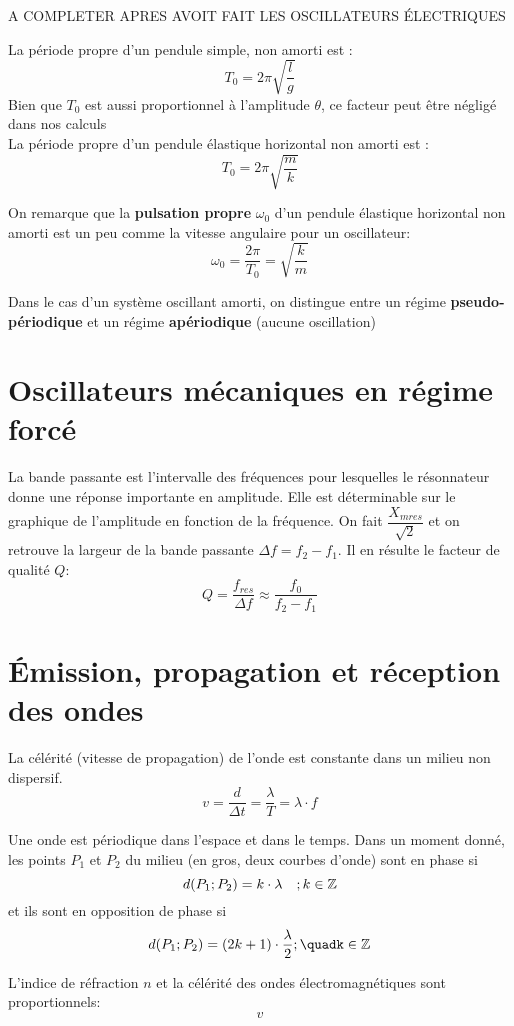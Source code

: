 \begin{Definition}
A COMPLETER APRES AVOIT FAIT LES OSCILLATEURS ÉLECTRIQUES

La période propre d'un pendule simple, non amorti est :
$$T_{0}=2\pi\sqrt{\dfrac{l}{g}}$$
Bien que $T_{0}$ est aussi proportionnel à l'amplitude $\theta$, ce facteur peut être négligé dans nos calculs\\

La période propre d'un pendule élastique horizontal non amorti est :
$$T_{0}=2\pi\sqrt{\dfrac{m}{k}}$$

On remarque que la \textbf{pulsation propre} $\omega_{0}$ d'un pendule élastique horizontal non amorti est un peu comme la vitesse angulaire pour un oscillateur:
$$\omega_{0}=\dfrac{2\pi}{T_{0}}=\sqrt{\dfrac{k}{m}}$$

Dans le cas d'un système oscillant amorti, on distingue entre un régime \textbf{pseudo-périodique} et un régime \textbf{apériodique} (aucune oscillation)

\end{Definition}



\section{Oscillateurs mécaniques en régime forcé}

\begin{Definition}

La bande passante est l'intervalle des fréquences pour lesquelles le résonnateur donne une réponse importante en amplitude. Elle est déterminable sur le graphique de l'amplitude en fonction de la fréquence. On fait $\dfrac{X_{mres}}{\sqrt{2}}$ et on retrouve la largeur de la bande passante $\Delta f = f_{2} - f_{1}$. Il en résulte le facteur de qualité $Q$:
$$Q=\dfrac{f_{res}}{\Delta f} \approx \dfrac{f_{0}}{f_{2}-f_{1}} $$

\end{Definition}



\section{Émission, propagation et réception des ondes}

\begin{Definition}

La célérité (vitesse de propagation) de l'onde est constante dans un milieu non dispersif.
$$v=\dfrac{d}{\Delta t} = \dfrac{\lambda}{T} = \lambda \cdot f$$

Une onde est périodique dans l'espace et dans le temps. Dans un moment donné, les points $P_{1}$ et $P_{2}$ du milieu (en gros, deux courbes d'onde) sont en phase si
$$d(P_{1};P_{2})=k\cdot\lambda\quad;k\in\mathbb{Z}$$
et ils sont en opposition de phase si
$$d(P_{1};P_{2})=(2k+1)\cdot\dfrac{\lambda}{2};\quadk\in\Z$$

L'indice de réfraction $n$ et la célérité des ondes électromagnétiques sont proportionnels:
$$v$$
\end{Definition}


